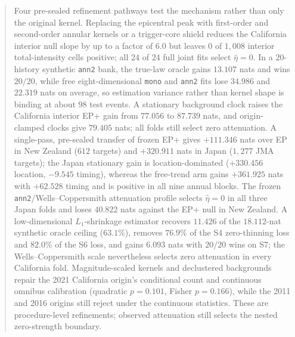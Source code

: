\begin{abstract}
Four pre-sealed refinement pathways test the mechanism rather than only the original kernel. Replacing the epicentral peak with first-order and second-order annular kernels or a trigger-core shield reduces the California interior null slope by up to a factor of $6.0$ but leaves $0$ of $1{,}008$ interior total-intensity cells positive; all $24$ of $24$ full joint fits select $\hat\eta=0$. In a $20$-history synthetic \texttt{ann2} bank, the true-law oracle gains $13.107$ nats and wins $20/20$, while free eight-dimensional \texttt{mono} and \texttt{ann2} fits lose $34.986$ and $22.319$ nats on average, so estimation variance rather than kernel shape is binding at about $98$ test events. A stationary background clock raises the California interior EP+ gain from $77.056$ to $87.739$ nats, and origin-clamped clocks give $79.405$ nats; all folds still select zero attenuation. A single-pass, pre-sealed transfer of frozen EP+ gives $+111.346$ nats over EP in New Zealand ($612$ targets) and $+320.911$ nats in Japan ($1{,}277$ JMA targets); the Japan stationary gain is location-dominated ($+330.456$ location, $-9.545$ timing), whereas the free-trend arm gains $+361.925$ nats with $+62.528$ timing and is positive in all nine annual blocks. The frozen \texttt{ann2}/Wells--Coppersmith attenuation profile selects $\hat\eta=0$ in all three Japan folds and loses $40.822$ nats against the EP+ null in New Zealand. A low-dimensional $L_1$-shrinkage estimator recovers $11.426$ of the $18.112$-nat synthetic oracle ceiling ($63.1\%$), removes $76.9\%$ of the S4 zero-thinning loss and $82.0\%$ of the S6 loss, and gains $6.093$ nats with $20/20$ wins on S7; the Wells--Coppersmith scale nevertheless selects zero attenuation in every California fold. Magnitude-scaled kernels and declustered backgrounds repair the 2021 California origin's conditional count and continuous omnibus calibration (quadratic $p=0.101$, Fisher $p=0.166$), while the 2011 and 2016 origins still reject under the continuous statistics. These are procedure-level refinements; observed attenuation still selects the nested zero-strength boundary.


\end{abstract}
